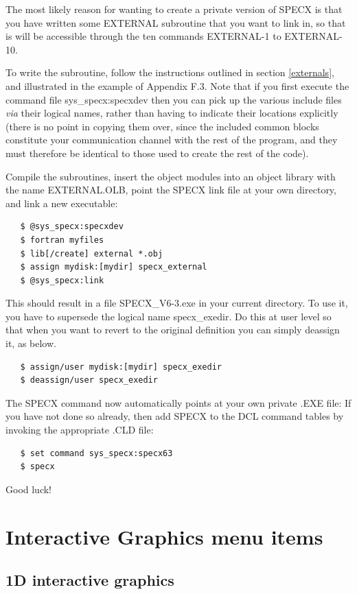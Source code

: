 \documentclass[11pt,twoside]{report}
\begin{document}
The most likely reason for wanting to create a private version of SPECX is
that you have written some EXTERNAL subroutine that you want to link in, so
that is will be accessible through the ten commands EXTERNAL-1 to EXTERNAL-10.

To write the subroutine, follow the instructions outlined in section
\ref{externals}, and illustrated in the example of Appendix F.3. Note that if
you first execute the command file sys\_specx:specxdev then you can pick up the
various include files {\em via} their logical names, rather than having to
indicate their locations explicitly (there is no point in copying them over,
since the included common blocks constitute your communication channel with the
rest of the program, and they must therefore be identical to those used to
create the rest of the code). 

Compile the subroutines, insert the object modules into an object library
with the name EXTERNAL.OLB, point the SPECX link file at your own directory,
and link a new executable: 
\begin{verbatim}
   $ @sys_specx:specxdev
   $ fortran myfiles
   $ lib[/create] external *.obj
   $ assign mydisk:[mydir] specx_external
   $ @sys_specx:link
\end{verbatim}

This should result in a file SPECX\_V6-3.exe in your current directory. To
use it, you have to supersede the logical name specx\_exedir. Do this
at user level so that when you want to revert to the original
definition you can simply deassign it, as below.
\begin{verbatim}
   $ assign/user mydisk:[mydir] specx_exedir
   $ deassign/user specx_exedir
\end{verbatim}

The SPECX command now automatically points at your own private .EXE file: If you
have not done so already, then add SPECX to the DCL command tables
by invoking the appropriate .CLD file:
\begin{verbatim}
   $ set command sys_specx:specx63
   $ specx
\end{verbatim}

Good luck!

\newpage
\chapter{Interactive Graphics menu items} 
\section{1D interactive graphics}
\end{document}
